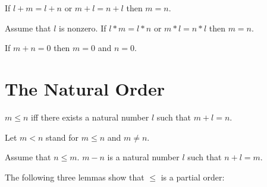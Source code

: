 \documentclass[11pt]{article}
\begin{document}
\begin{forthel}
\begin{axiom}
If $l + m = l + n$ or $m + l = n + l$ then $m = n$.
\end{axiom}

\begin{axiom}
Assume that $l$ is nonzero.
If $l * m = l * n$ or $m * l = n * l$ then $m = n$.
\end{axiom}

\begin{axiom}
If $m + n = 0$ then $m = 0$ and $n = 0$.
\end{axiom}

\end{forthel}


\section{The Natural Order}

\begin{forthel}

\begin{definition}
$m \leq n$ iff
there exists a natural number $l$ such that $m + l = n$.
\end{definition}

Let $m < n$ stand for $m \leq n$ and $m \neq n$.

\begin{definition}
Assume that $n \leq m$.
$m - n$ is a natural number $l$ such that $n + l  = m$.
\end{definition}

\end{forthel}

The following three lemmas show that $\leq$ is a partial order:
\end{document}
